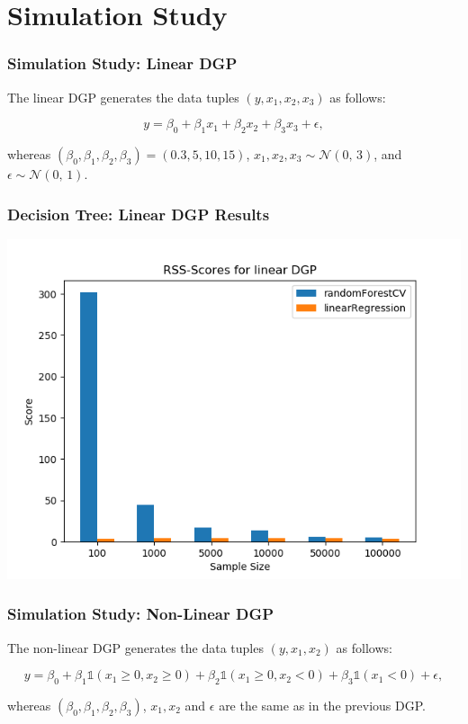\section{Simulation Study}

\begin{frame}
    \frametitle{Simulation Study: Linear DGP}
    The linear DGP generates the data tuples \( (y, x_{1}, x_{2}, x_{3}) \) as follows:

    \begin{equation}\label{eq:linear_dgp}
        y = \beta_{0} + \beta_{1} x_{1} + \beta_{2} x_{2} + \beta_{3} x_{3} + \epsilon,
    \end{equation}
    
    whereas \( (\beta_{0}, \beta_{1}, \beta_{2}, \beta_{3}) = (0.3, 5, 10, 15) \),
    \( x_{1}, x_{2}, x_{3} \sim \mathcal{N}(0,\,3) \), and \( \epsilon \sim \mathcal{N}(0,\,1) \).
\end{frame}

\begin{frame}
	\frametitle{Decision Tree: Linear DGP Results}
	\begin{center}		
		\includegraphics[height=0.7\textheight]{images/forest_vs_ols_linearDGP.png}
	\end{center}
\end{frame}


\begin{frame}
    \frametitle{Simulation Study: Non-Linear DGP}
    The non-linear DGP generates the data tuples \( (y, x_{1}, x_{2}) \) as follows:

    \begin{equation}\label{eq:non_linear_dgp}
        y = \beta_{0} + \beta_{1} \mathds{1}(x_{1} \geq 0, x_{2} \geq 0) + \beta_{2} \mathds{1}(x_{1} \geq 0, x_{2} < 0) + \beta_{3} \mathds{1}(x_{1} < 0) + \epsilon,
    \end{equation}
    
    whereas \( (\beta_{0}, \beta_{1}, \beta_{2}, \beta_{3}) \), \( x_{1}, x_{2} \) and \(  \epsilon \)
    are the same as in the previous DGP.
\end{frame}

